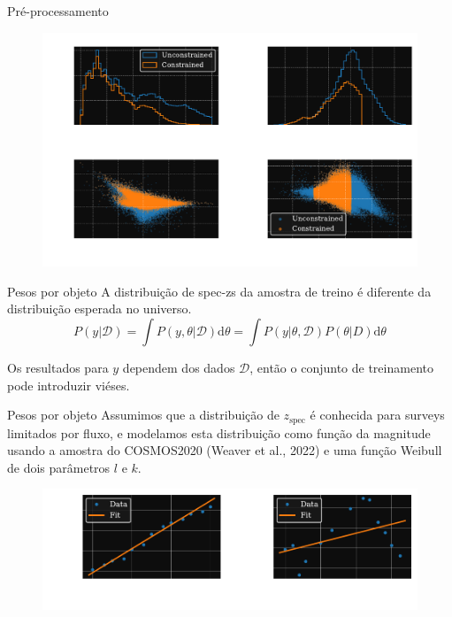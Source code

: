\begin{frame}[c]{Pré-processamento}
    \begin{figure}
        \centering
        \includegraphics[height=7cm]{script/images/constraints_effect.pdf}
    \end{figure}
\end{frame}

\begin{frame}[c]{Pesos por objeto}
    A distribuição de spec-zs da amostra de treino é diferente da distribuição esperada no universo.
    \begin{equation*}
        P(y|\mathcal{D}) = \int P(y,\theta|\mathcal{D}) \text{d}\theta = \int P(y|\theta, \mathcal{D}) P(\theta|D) \text{d}\theta
    \end{equation*}
    \begin{splusbox}{}
        Os resultados para $y$ dependem dos dados $\mathcal{D}$, então o conjunto de treinamento pode introduzir viéses.
    \end{splusbox}
\end{frame}

\begin{frame}[c]{Pesos por objeto}
    Assumimos que a distribuição de $z_\text{spec}$ é conhecida para surveys limitados por fluxo, e modelamos esta distribuição como função da magnitude usando a amostra do COSMOS2020 (Weaver et al., 2022) e uma função Weibull de dois parâmetros $l$ e $k$.

    \begin{figure}
        \centering
        \includegraphics[width=\linewidth]{script/images/laerte_fit.pdf}
    \end{figure}
\end{frame}

